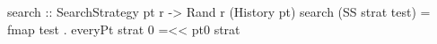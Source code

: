 search :: SearchStrategy pt r -> Rand r (History pt)
search (SS strat test) =
  fmap test . everyPt strat 0 =<< pt0 strat
